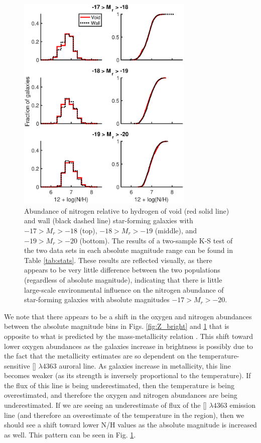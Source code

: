 \begin{figure}
    \centering
    \includegraphics[width=0.75\textwidth]{Images/Paper2/1sig_17-20_SF_t3_12logNH_stacked}
    \caption[Nitrogen distribution of star-forming galaxies with 
    $-17 > M_r > -20$]{Abundance of nitrogen relative to hydrogen of void (red 
    solid line) and wall (black dashed line) star-forming galaxies with 
    $-17 > M_r > -18$ (top), $-18 > M_r > -19$ (middle), and $-19 > M_r > -20$ 
    (bottom).  The results of a two-sample K-S test of the two data sets in each 
    absolute magnitude range can be found in Table \ref{tab:stats}.  These 
    results are reflected visually, as there appears to be very little 
    difference between the two populations (regardless of absolute magnitude), 
    indicating that there is little large-scale environmental influence on the 
    nitrogen abundance of star-forming galaxies with absolute magnitudes 
    $-17 > M_r > -20$.}
    \label{fig:N_bright}
\end{figure}

We note that there appears to be a shift in the oxygen and nitrogen abundances 
between the absolute magnitude bins in Figs. \ref{fig:Z_bright} and 
\ref{fig:N_bright} that is opposite to what is predicted by the mass-metallicity 
relation \citep{Tremonti04}.  This shift toward lower oxygen abundances as the 
galaxies increase in brightness is possibly due to the fact that the metallicity 
estimates are so dependent on the temperature-sensitive [] 
$\lambda 4363$ auroral line.  As galaxies increase in metallicity, this line 
becomes weaker (as its strength is inversely proportional to the temperature).  
If the flux of this line is being underestimated, then the temperature is being 
overestimated, and therefore the oxygen and nitrogen abundances are being 
underestimated.  If we are seeing an underestimate of flux of the [] 
$\lambda 4363$ emission line (and therefore an overestimate of the temperature 
in the region), then we should see a shift toward lower N/H values as the 
absolute magnitude is increased as well.  This pattern can be seen in Fig. 
\ref{fig:N_bright}.

